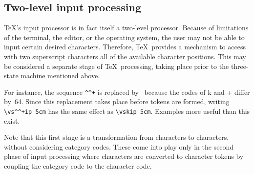 \documentclass[letterpaper]{book}
\begin{document}
\subsection{Two-level input processing}

\TeX's input processor is in fact itself a two-level processor.
Because of limitations of the terminal, the editor, or the operating
system, the user may not be able to input certain desired characters.
Therefore, \TeX\ provides a mechanism to access
with two superscript characters all of the available character
positions. This may be considered
a separate stage of \TeX\ processing, taking place
prior to the three-state machine mentioned above.

For instance, the sequence \verb>^^+> is replaced by~ because
the \ascii{} codes of \n k and \n + differ by~64. 
Since this replacement takes place before tokens are formed,
writing \verb>\vs^^+ip 5cm> has the same effect as
\verb>\vskip 5cm>. Examples more useful than this exist.

Note that this first stage is a transformation from
characters to characters, without considering category
codes. These come into play only in the second phase
of input processing where characters are converted
to character tokens by coupling the category code
to the character code.

\end{document}
